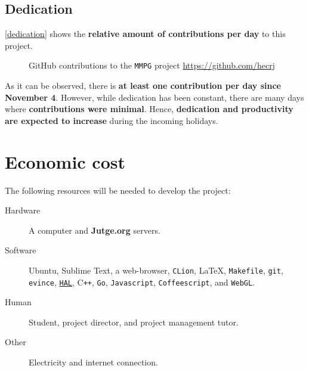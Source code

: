 \documentclass[a4paper,11pt,titlepage,abstract,numbers=noenddot,automark,mnsy,intlimits,rgb,dvipsnames]{report}
\begin{document}
\section{Dedication}
\autoref{dedication} shows the \textbf{relative amount of contributions per day} to this project.
\begin{figure}[H]
\caption{GitHub contributions to the \texttt{MMPG} project \url{https://github.com/hecrj}}
\label{dedication}
\end{figure}
As it can be observed, there is \textbf{at least one contribution per day since November 4}. However, while dedication has
been constant, there are many days where \textbf{contributions were minimal}. Hence, \textbf{dedication and productivity are expected
to increase} during the incoming holidays.
\clearpage
\chapter{Economic cost}
The following resources will be needed to develop the project:
\begin{description}
\item[Hardware]
A computer and \textbf{Jutge.org} servers.
\item[Software]
Ubuntu, Sublime Text, a web-browser, \texttt{CLion}, \LaTeX{}, \texttt{Makefile}, \texttt{git}, \texttt{evince},
  \href{https://github.com/hecrj/hal/raw/master/doc/full/report.pdf}{\texttt{HAL}}, \texttt{}C\texttt{++}, \texttt{Go},
  \texttt{Javascript}, \texttt{Coffeescript}, and \texttt{WebGL}.
\item[Human]
Student, project director, and project management tutor.
\item[Other]
Electricity and internet connection.
\end{description}
\end{document}
